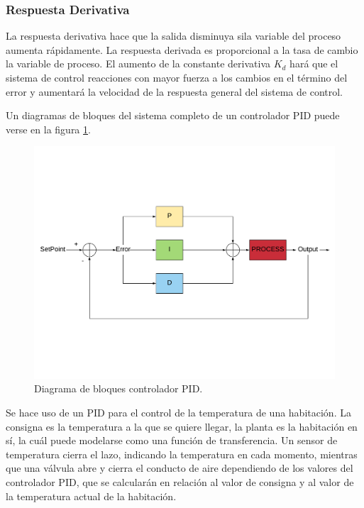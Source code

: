 \subsubsection{Respuesta Derivativa}
La respuesta derivativa hace que la salida disminuya sila variable del proceso aumenta rápidamente. La respuesta derivada es proporcional a la tasa de cambio la variable de proceso. El aumento de la constante derivativa $K_{d}$ hará que el sistema de control reacciones con mayor fuerza a los cambios en el término del error y aumentará la velocidad de la respuesta general del sistema de control. 

Un diagramas de bloques del sistema completo de un controlador PID puede verse en la figura \ref{fig:PID}.

\begin{center}
	\begin{figure}[H]
		\center
		\includegraphics[trim = 0mm 4cm 0mm 4cm,clip, angle=0, scale = 0.5]{imagenes/EstadoArte/PID}
		\caption{Diagrama de bloques controlador PID.}
		\label{fig:PID}
	\end{figure}
\end{center}

\begin{ejemplo}
Se hace uso de un PID para el control de la temperatura de una habitación. La consigna es la temperatura a la que se quiere llegar, la planta es la habitación en sí, la cuál puede modelarse como una función de transferencia. Un sensor de temperatura cierra el lazo, indicando la temperatura en cada momento, mientras que una válvula abre y cierra el conducto de aire dependiendo de los valores del controlador PID, que se calcularán en relación al valor de consigna y al valor de la temperatura actual de la habitación.
\end{ejemplo} 











